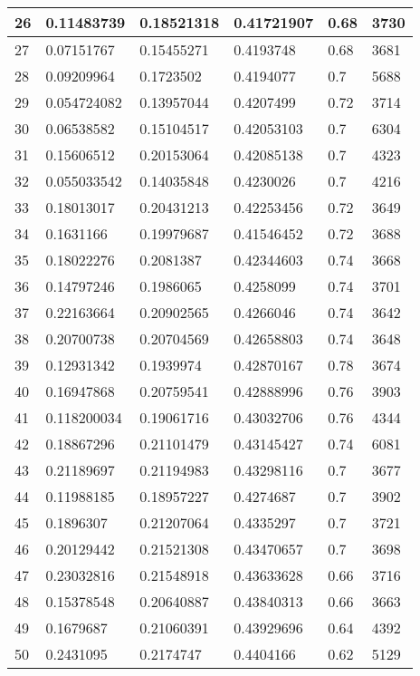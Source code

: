 \begin{longtable}{|l|l|l|l|l|l|}
26 & 0.11483739 & 0.18521318 & 0.41721907 & 0.68 & 3730 \\ \hline 
27 & 0.07151767 & 0.15455271 & 0.4193748 & 0.68 & 3681 \\ \hline 
28 & 0.09209964 & 0.1723502 & 0.4194077 & 0.7 & 5688 \\ \hline 
29 & 0.054724082 & 0.13957044 & 0.4207499 & 0.72 & 3714 \\ \hline 
30 & 0.06538582 & 0.15104517 & 0.42053103 & 0.7 & 6304 \\ \hline 
31 & 0.15606512 & 0.20153064 & 0.42085138 & 0.7 & 4323 \\ \hline 
32 & 0.055033542 & 0.14035848 & 0.4230026 & 0.7 & 4216 \\ \hline 
33 & 0.18013017 & 0.20431213 & 0.42253456 & 0.72 & 3649 \\ \hline 
34 & 0.1631166 & 0.19979687 & 0.41546452 & 0.72 & 3688 \\ \hline 
35 & 0.18022276 & 0.2081387 & 0.42344603 & 0.74 & 3668 \\ \hline 
36 & 0.14797246 & 0.1986065 & 0.4258099 & 0.74 & 3701 \\ \hline 
37 & 0.22163664 & 0.20902565 & 0.4266046 & 0.74 & 3642 \\ \hline 
38 & 0.20700738 & 0.20704569 & 0.42658803 & 0.74 & 3648 \\ \hline 
39 & 0.12931342 & 0.1939974 & 0.42870167 & 0.78 & 3674 \\ \hline 
40 & 0.16947868 & 0.20759541 & 0.42888996 & 0.76 & 3903 \\ \hline 
41 & 0.118200034 & 0.19061716 & 0.43032706 & 0.76 & 4344 \\ \hline 
42 & 0.18867296 & 0.21101479 & 0.43145427 & 0.74 & 6081 \\ \hline 
43 & 0.21189697 & 0.21194983 & 0.43298116 & 0.7 & 3677 \\ \hline 
44 & 0.11988185 & 0.18957227 & 0.4274687 & 0.7 & 3902 \\ \hline 
45 & 0.1896307 & 0.21207064 & 0.4335297 & 0.7 & 3721 \\ \hline 
46 & 0.20129442 & 0.21521308 & 0.43470657 & 0.7 & 3698 \\ \hline 
47 & 0.23032816 & 0.21548918 & 0.43633628 & 0.66 & 3716 \\ \hline 
48 & 0.15378548 & 0.20640887 & 0.43840313 & 0.66 & 3663 \\ \hline 
49 & 0.1679687 & 0.21060391 & 0.43929696 & 0.64 & 4392 \\ \hline 
50 & 0.2431095 & 0.2174747 & 0.4404166 & 0.62 & 5129 \\ \hline 
\end{longtable}
